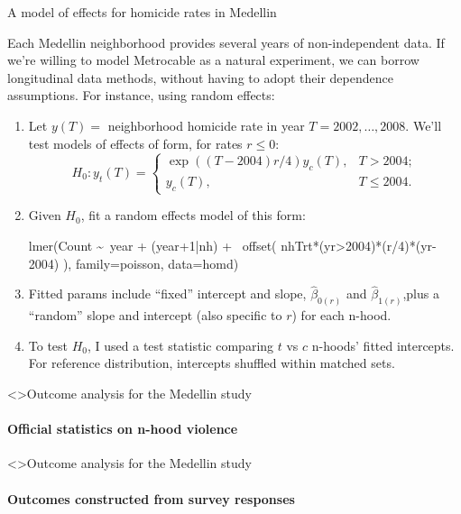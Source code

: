 \begin{frame}[fragile]{A model of effects for homicide rates in Medellin}

Each Medellin neighborhood provides several years of non-independent
data.  If we're willing to model Metrocable as a natural experiment,
we can borrow longitudinal data methods, without having to adopt their
dependence assumptions.   For instance, using random
 effects: 

 \begin{enumerate}[<+->]
 \item Let
   $y(T)=$ neighborhood homicide rate in year $T=2002, \ldots, 2008$.  We'll test models of
   effects of form, for rates $r \leq 0$:
$$H_{0}: y_{t}(T) = \left\{ \begin{array}{lr}\exp((T-2004) r/4)
                              y_{c}(T),& T> 2004; \\
y_{c}(T),& T\leq 2004.\end{array} \right.$$ 
 \item Given $H_{0}$, fit a random effects model of this form:
\begin{semiverbatim}
 lmer(Count \textasciitilde\  year + (year+1|nh) +\ \pause
            \alert<@+| handout:0>{offset}( nhTrt*(yr>2004)*(r/4)*(yr-2004) ),
          family=poisson, data=homd)
\end{semiverbatim}
\item Fitted params include  ``fixed'' intercept and slope,
  $\hat{\beta}_{0(r)}$ and $ \hat{\beta}_{1(r)}$,\pause  plus a
  ``random'' slope and intercept (also specific to $r$) for
  each n-hood.  
\item To test $H_{0}$, I used a test statistic comparing $t$ vs $c$
  n-hoods' fitted intercepts. For reference distribution, 
  intercepts shuffled within matched sets.
 \end{enumerate}

  
\end{frame}

\begin{frame}<\nottheirhandout>{Outcome analysis for the Medellin study}
\framesubtitle{Official statistics on n-hood violence}
  
  \begin{center}
  \end{center}

\end{frame}



\begin{frame}<\nottheirhandout>{Outcome analysis for the Medellin
    study}
\framesubtitle{Outcomes constructed from survey responses}

\begin{center}
\end{center}
\end{frame}

